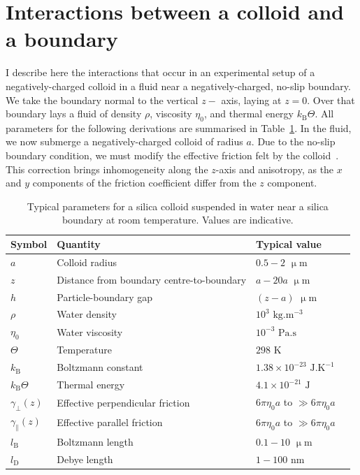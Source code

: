 \section{Interactions between a colloid and a boundary}
I describe here the interactions that occur in an experimental setup of a negatively-charged colloid in a fluid near a negatively-charged, no-slip boundary. We take the boundary normal to the vertical $z-$ axis, laying at $z=0$. Over that boundary lays a fluid of density $\rho$, viscosity $\eta_0$, and thermal energy $k_\mathrm{B} \Theta$. All parameters for the following derivations are summarised in Table~\ref{tab:physical_parameters}. In the fluid, we now submerge a negatively-charged colloid of radius $a$. Due to the no-slip boundary condition, we must modify the effective friction felt by the colloid~\cite{brenner_slow_1961,Faxen_1924}. This correction brings inhomogeneity along the $z$-axis and anisotropy, as the $x$ and $y$ components of the friction coefficient differ from the $z$ component.
\begin{table}
\centering
\caption{Typical parameters for a silica colloid suspended in water near a silica boundary at room temperature. Values are indicative.}
\label{tab:physical_parameters}
\begin{tabular}{llll}
\hline
Symbol & Quantity & Typical value \\
\hline
$a$ & Colloid radius & $0.5 - 2$ $\upmu \mathrm{m}$ \\
$z$ & Distance from boundary centre-to-boundary & $a - 20a$  $\upmu \mathrm{m}$ \\
$h$ & Particle-boundary gap  & $(z-a)$  $\upmu \mathrm{m}$ \\
\hline
$\rho$ & Water density & $10^3$ $\mathrm{kg.}\mathrm{m}^{-3}$ \\
$\eta_0$ & Water viscosity & $10^{-3}$ $\mathrm{Pa.}\mathrm{s}$ \\
\hline
$\Theta$ & Temperature & $298$ $\mathrm{K}$ \\
$k_\mathrm{B}$ & Boltzmann constant & $1.38\times10^{-23}$ $\mathrm{J}.\mathrm{K}^{-1}$ \\
$k_\mathrm{B}\Theta$ & Thermal energy & $4.1\times10^{-21}$  $\mathrm{J}$ \\
\hline
$\gamma_\perp(z)$ & Effective perpendicular friction & $6 \pi \eta_0 a$ to $\gg 6 \pi \eta_0 a$  \\
$\gamma_\parallel(z)$ & Effective parallel friction & $6 \pi \eta_0 a$ to $\gg 6 \pi \eta_0 a$  \\
\hline
$l_\mathrm{B}$ & Boltzmann length & $0.1 - 10$ $\upmu \mathrm{m}$ \\
$l_\mathrm{D}$ & Debye length & $1 - 100$ $\mathrm{nm}$ \\
\end{tabular}
\end{table}


